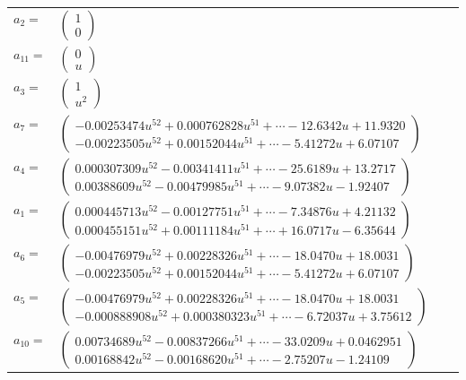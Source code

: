 \documentclass[1p]{elsarticle_modified}
\theoremstyle{definition}
\begin{document}
\begin{tabular}{m{7pt} m{180pt} m{7pt} m{180pt} }
\flushright $a_{2}=$&$\begin{pmatrix}1\\0\end{pmatrix}$ \\
\flushright $a_{11}=$&$\begin{pmatrix}0\\u\end{pmatrix}$ \\
\flushright $a_{3}=$&$\begin{pmatrix}1\\u^2\end{pmatrix}$ \\
\flushright $a_{7}=$&$\begin{pmatrix}-0.00253474 u^{52}+0.000762828 u^{51}+\cdots-12.6342 u+11.9320\\-0.00223505 u^{52}+0.00152044 u^{51}+\cdots-5.41272 u+6.07107\end{pmatrix}$ \\
\flushright $a_{4}=$&$\begin{pmatrix}0.000307309 u^{52}-0.00341411 u^{51}+\cdots-25.6189 u+13.2717\\0.00388609 u^{52}-0.00479985 u^{51}+\cdots-9.07382 u-1.92407\end{pmatrix}$ \\
\flushright $a_{1}=$&$\begin{pmatrix}0.000445713 u^{52}-0.00127751 u^{51}+\cdots-7.34876 u+4.21132\\0.000455151 u^{52}+0.00111184 u^{51}+\cdots+16.0717 u-6.35644\end{pmatrix}$ \\
\flushright $a_{6}=$&$\begin{pmatrix}-0.00476979 u^{52}+0.00228326 u^{51}+\cdots-18.0470 u+18.0031\\-0.00223505 u^{52}+0.00152044 u^{51}+\cdots-5.41272 u+6.07107\end{pmatrix}$ \\
\flushright $a_{5}=$&$\begin{pmatrix}-0.00476979 u^{52}+0.00228326 u^{51}+\cdots-18.0470 u+18.0031\\-0.000888908 u^{52}+0.000380323 u^{51}+\cdots-6.72037 u+3.75612\end{pmatrix}$ \\
\flushright $a_{10}=$&$\begin{pmatrix}0.00734689 u^{52}-0.00837266 u^{51}+\cdots-33.0209 u+0.0462951\\0.00168842 u^{52}-0.00168620 u^{51}+\cdots-2.75207 u-1.24109\end{pmatrix}$ \\

\end{tabular}
\end{document}
